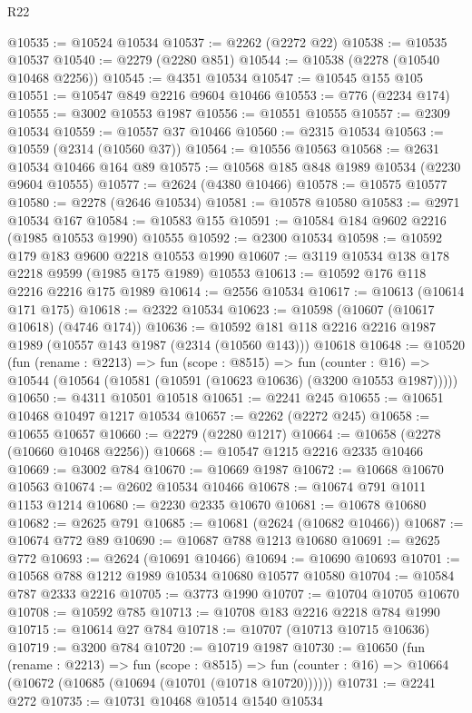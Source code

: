 \begin{lexlean}{R22}
\begin{coremodule}
@10535 := @10524 @10534
@10537 := @2262 (@2272 @22)
@10538 := @10535 @10537
@10540 := @2279 (@2280 @851)
@10544 := @10538 (@2278 (@10540 @10468 @2256))
@10545 := @4351 @10534
@10547 := @10545 @155 @105
@10551 := @10547 @849 @2216 @9604 @10466
@10553 := @776 (@2234 @174)
@10555 := @3002 @10553 @1987
@10556 := @10551 @10555
@10557 := @2309 @10534
@10559 := @10557 @37 @10466
@10560 := @2315 @10534
@10563 := @10559 (@2314 (@10560 @37))
@10564 := @10556 @10563
@10568 := @2631 @10534 @10466 @164 @89
@10575 := @10568 @185 @848 @1989 @10534 (@2230 @9604 @10555)
@10577 := @2624 (@4380 @10466)
@10578 := @10575 @10577
@10580 := @2278 (@2646 @10534)
@10581 := @10578 @10580
@10583 := @2971 @10534 @167
@10584 := @10583 @155
@10591 := @10584 @184 @9602 @2216 (@1985 @10553 @1990) @10555
@10592 := @2300 @10534
@10598 := @10592 @179 @183 @9600 @2218 @10553 @1990
@10607 := @3119 @10534 @138 @178 @2218 @9599 (@1985 @175 @1989) @10553
@10613 := @10592 @176 @118 @2216 @2216 @175 @1989
@10614 := @2556 @10534
@10617 := @10613 (@10614 @171 @175)
@10618 := @2322 @10534
@10623 := @10598 (@10607 (@10617 @10618) (@4746 @174))
@10636 := @10592 @181 @118 @2216 @2216 @1987 @1989 (@10557 @143 @1987 (@2314 (@10560 @143))) @10618
@10648 := @10520
    (fun (rename : @2213) =>
    fun (scope : @8515) =>
    fun (counter : @16) => @10544 (@10564 (@10581 (@10591 (@10623 @10636) (@3200 @10553 @1987)))))
@10650 := @4311 @10501 @10518
@10651 := @2241 @245
@10655 := @10651 @10468 @10497 @1217 @10534
@10657 := @2262 (@2272 @245)
@10658 := @10655 @10657
@10660 := @2279 (@2280 @1217)
@10664 := @10658 (@2278 (@10660 @10468 @2256))
@10668 := @10547 @1215 @2216 @2335 @10466
@10669 := @3002 @784
@10670 := @10669 @1987
@10672 := @10668 @10670 @10563
@10674 := @2602 @10534 @10466
@10678 := @10674 @791 @1011 @1153 @1214
@10680 := @2230 @2335 @10670
@10681 := @10678 @10680
@10682 := @2625 @791
@10685 := @10681 (@2624 (@10682 @10466))
@10687 := @10674 @772 @89
@10690 := @10687 @788 @1213 @10680
@10691 := @2625 @772
@10693 := @2624 (@10691 @10466)
@10694 := @10690 @10693
@10701 := @10568 @788 @1212 @1989 @10534 @10680 @10577 @10580
@10704 := @10584 @787 @2333 @2216
@10705 := @3773 @1990
@10707 := @10704 @10705 @10670
@10708 := @10592 @785
@10713 := @10708 @183 @2216 @2218 @784 @1990
@10715 := @10614 @27 @784
@10718 := @10707 (@10713 @10715 @10636)
@10719 := @3200 @784
@10720 := @10719 @1987
@10730 := @10650
    (fun (rename : @2213) =>
    fun (scope : @8515) =>
    fun (counter : @16) => @10664 (@10672 (@10685 (@10694 (@10701 (@10718 @10720))))))
@10731 := @2241 @272
@10735 := @10731 @10468 @10514 @1540 @10534

\end{coremodule}
\end{lexlean}
